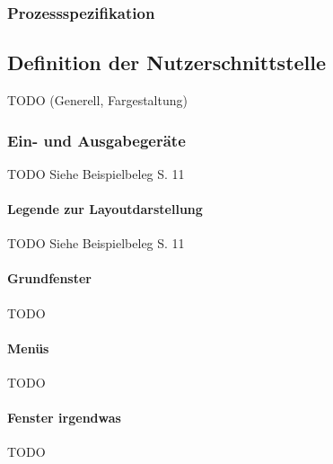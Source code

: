 \subsubsection{Prozessspezifikation}






\subsection{Definition der Nutzerschnittstelle}
TODO (Generell, Fargestaltung)

\subsubsection{Ein- und Ausgabegeräte}
TODO Siehe Beispielbeleg S. 11

\paragraph{Legende zur Layoutdarstellung}
TODO Siehe Beispielbeleg S. 11

\paragraph{Grundfenster}
TODO

\paragraph{Menüs}
TODO

\paragraph{Fenster irgendwas}
TODO
